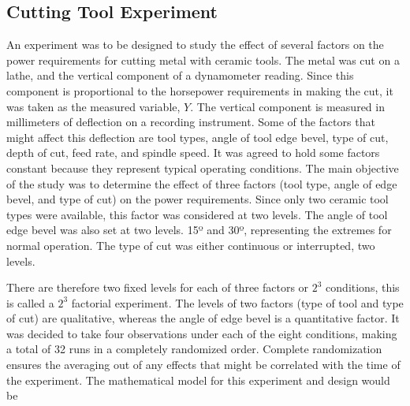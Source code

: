 \documentclass{WileySev}
\begin{document}
\subsection{Cutting Tool Experiment}

An experiment was to be designed to study the effect of several factors on the power requirements for cutting metal with ceramic tools. The metal was cut on a lathe, and the vertical component of a dynamometer reading. Since this component is proportional to the horsepower requirements in making the cut, it was taken as the measured variable, $Y$. The vertical component is measured in millimeters of deflection on a recording instrument. Some of the factors that might affect this deflection are tool types, angle of tool edge bevel, type of cut, depth of cut, feed rate, and spindle speed. It was agreed to hold some factors constant because they represent typical operating conditions. The main objective of the study was to determine the effect of three factors (tool type, angle of edge bevel, and type of cut) on the power requirements. Since only two ceramic tool types were available, this factor was considered at two levels. The angle of tool edge bevel was also set at two levels. 15º and 30º, representing the extremes for normal operation. The type of cut was either continuous or interrupted, two levels.

There are therefore two fixed levels for each of three factors or $2^3$ conditions, this is called a $2^3$ factorial experiment. The levels of two factors (type of tool and type of cut) are qualitative, whereas the angle of edge bevel is a quantitative factor. It was decided to take four observations under each of the eight conditions, making a total of 32 runs in a completely randomized order. Complete randomization ensures the averaging out of any effects that might be correlated with the time of the experiment. The mathematical model for this experiment and design would be
\end{document}
